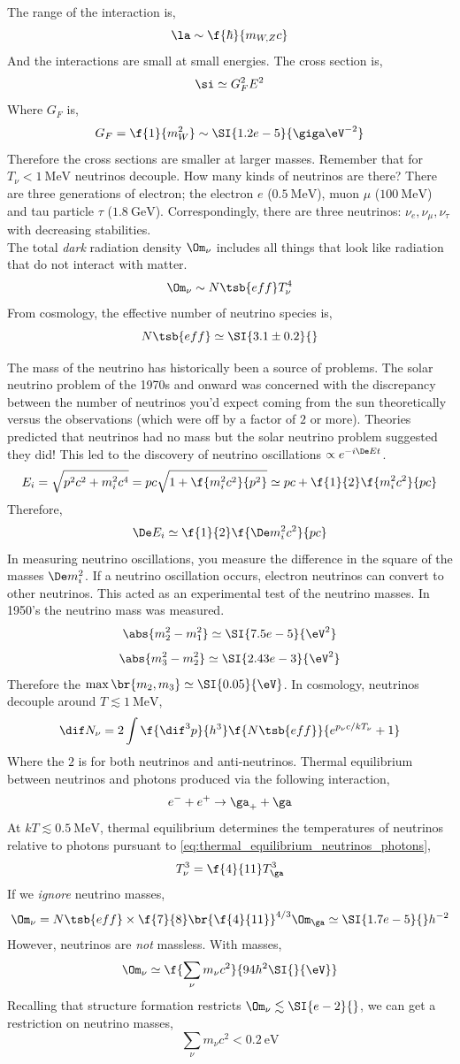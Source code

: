 \documentclass{article}
\begin{document}
The range of the interaction is,
\[ \la \sim \f{\hbar }{m_{W, Z} c} \]
And the interactions are small at small energies. The cross section is,
\[ \si \simeq G_F^2 E^2 \]
Where $G_F$ is,
\[ G_F = \f{1}{m_{W}^2} \sim \SI{1.2e-5}{\giga \eV^{-2}} \]
Therefore the cross sections are smaller at larger masses. Remember that for $T_{\nu} < \SI{1}{\mega \eV}$ neutrinos decouple. How many kinds of neutrinos are there? There are three generations of electron; the electron $e$ ($\SI{0.5}{\mega\eV}$), muon $\mu$ ($\SI{100}{\mega\eV}$) and tau particle $\tau$ ($\SI{1.8}{\giga\eV}$). Correspondingly, there are three neutrinos: $\nu_{e}, \nu_{\mu}, \nu_{\tau}$ with decreasing stabilities. \\

The total \textit{dark} radiation density $\Om_{\nu}$ includes all things that look like radiation that do not interact with matter.
\[ \Om_{\nu} \sim N\tsb{eff} T_{\nu}^4 \]
From cosmology, the effective number of neutrino species is,
\[ N\tsb{eff} \simeq \SI{3.1\pm0.2}{} \]

The mass of the neutrino has historically been a source of problems. The solar neutrino problem of the 1970s and onward was concerned with the discrepancy between the number of neutrinos you'd expect coming from the sun theoretically versus the observations (which were off by a factor of $2$ or more). Theories predicted that neutrinos had no mass but the solar neutrino problem suggested they did! This led to the discovery of neutrino oscillations $\propto e^{-i \De Et}$.
\[ E_i = \sqrt{p^2 c^2 + m_i^2 c^4} = pc \sqrt{1 + \f{m_i^2 c^2}{p^2}} \simeq pc + \f{1}{2} \f{m_i^2c^2}{pc} \]
Therefore,
\[ \De E_i \simeq \f{1}{2}\f{\De m_i^2c^2}{pc} \]
In measuring neutrino oscillations, you measure the difference in the square of the masses $\De m_i^2$. If a neutrino oscillation occurs, electron neutrinos can convert to other neutrinos. This acted as an experimental test of the neutrino masses. In 1950's the neutrino mass was measured.
\[ \abs{m_2^2 - m_1^2} \simeq \SI{7.5e-5}{\eV^2} \]
\[ \abs{m_3^2 - m_2^2} \simeq \SI{2.43e-3}{\eV^2} \]
Therefore the $\max \br{m_2, m_3} \simeq \SI{0.05}{\eV}$. In cosmology, neutrinos decouple around $T \lesssim \SI{1}{\mega \eV}$,
\[ \dif N_\nu = 2 \int \f{\dif^3 p}{h^3} \f{N\tsb{eff}}{e^{p_{\nu}c / kT_{\nu}} + 1} \]
Where the $2$ is for both neutrinos and anti-neutrinos. Thermal equilibrium between neutrinos and photons produced via the following interaction,
\[ e^{-} + e^{+} \to \ga_{+} + \ga  \]
At $kT \lesssim \SI{0.5}{\mega \eV}$, thermal equilibrium determines the temperatures of neutrinos relative to photons pursuant to \cref{eq:thermal_equilibrium_neutrinos_photons},
\[ T_{\nu}^3 = \f{4}{11} T_{\ga}^3 \]
If we \textit{ignore} neutrino masses,
\[ \Om_{\nu} = N\tsb{eff} \times \f{7}{8} \br{\f{4}{11}}^{4/3} \Om_{\ga} \simeq \SI{1.7e-5}{}h^{-2}    \]
However, neutrinos are \textit{not} massless. With masses,
\[ \Om_{\nu} \simeq \f{\sum_{\nu} m_{\nu} c^2}{94 h^2 \SI{}{\eV}}\]
Recalling that structure formation restricts $\Om_\nu \lesssim \SI{e-2}{}$, we can get a restriction on neutrino masses,
\[ \sum_{\nu} m_{\nu}c^2 < \SI{0.2}{\eV} \]
\end{document}
